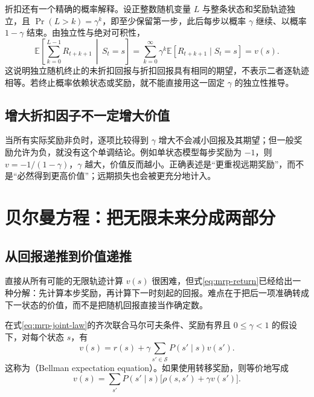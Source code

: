 \documentclass[UTF8]{ctexart}
\begin{document}
折扣还有一个精确的概率解释。设正整数随机变量 $L$ 与整条状态和奖励轨迹独立，且 $\Pr(L>k)=\gamma^k$，即至少保留第一步，此后每步以概率 $\gamma$ 继续、以概率 $1-\gamma$ 结束。由独立性与绝对可积性，
\begin{equation}
  \mathbb E\!\left[\sum_{k=0}^{L-1}R_{t+k+1}\,\middle|\,S_t=s\right]
  =\sum_{k=0}^{\infty}\gamma^k\mathbb E[R_{t+k+1}\mid S_t=s]
  =v(s).
  \label{eq:mrp-random-horizon}
\end{equation}
这说明独立随机终止的未折扣回报与折扣回报具有相同的期望，不表示二者逐轨迹相等。若终止概率依赖状态或奖励，就不能直接用这一固定 $\gamma$ 的独立性推导。

\subsection{增大折扣因子不一定增大价值}

当所有实际奖励非负时，逐项比较得到 $\gamma$ 增大不会减小回报及其期望；但一般奖励允许为负，就没有这个单调结论。例如单状态模型每步奖励为 $-1$，则 $v=-1/(1-\gamma)$，$\gamma$ 越大，价值反而越小。正确表述是“更重视远期奖励”，而不是“必然得到更高价值”；远期损失也会被更充分地计入。

\section{贝尔曼方程：把无限未来分成两部分}
\label{sec:mrp-bellman}

\subsection{从回报递推到价值递推}

直接从所有可能的无限轨迹计算 $v(s)$ 很困难，但式\eqref{eq:mrp-return}已经给出一种分解：先计算本步奖励，再计算下一时刻起的回报。难点在于把后一项准确转成下一状态的价值，而不是把随机回报直接当作确定数。

\begin{theorem}
\label{thm:mrp-bellman}
在式\eqref{eq:mrp-joint-law}的齐次联合马尔可夫条件、奖励有界且 $0\leq\gamma<1$ 的假设下，对每个状态 $s$，有
\begin{equation}
  v(s)=r(s)+\gamma\sum_{s'\in\mathcal S}P(s'\mid s)v(s').
  \label{eq:mrp-bellman}
\end{equation}
这称为（Bellman expectation equation）。如果使用转移奖励，则等价地写成
\begin{equation}
  v(s)=\sum_{s'}P(s'\mid s)\bigl[\rho(s,s')+\gamma v(s')\bigr].
  \label{eq:mrp-transition-bellman}
\end{equation}
\end{theorem}
\end{document}
